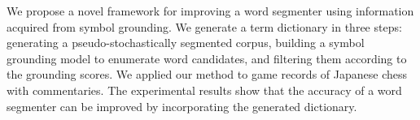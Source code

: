 We propose a novel framework for improving a word segmenter using information acquired from symbol grounding. We generate a term dictionary in three steps: generating a pseudo-stochastically segmented corpus, building a symbol grounding model to enumerate word candidates, and filtering them according to the grounding scores. We applied our method to game records of Japanese chess with commentaries. The experimental results show that the accuracy of a word segmenter can be improved by incorporating the generated dictionary.
